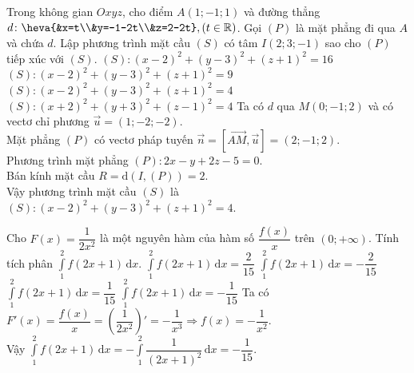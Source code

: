 \begin{ex}%
Trong không gian $Oxyz$, cho điểm $A(1;-1;1)$ và đường thẳng $d \colon \heva{&x=t\\&y=-1-2t\\&z=2-2t}, (t\in \mathbb{R})$. Gọi
$(P)$ là mặt phẳng đi qua $A$ và chứa $d$. Lập phương trình mặt cầu $(S)$ có tâm $I(2; 3;-1)$ sao cho $(P)$ tiếp xúc với $(S)$.
\choice
{$(S)\colon(x-2)^2+(y-3)^2+(z+1)^2=16$}
{$(S)\colon(x-2)^2+(y-3)^2+(z+1)^2=9$}
{\True $(S)\colon(x-2)^2+(y-3)^2+(z+1)^2=4$}
{$(S)\colon(x+2)^2+(y+3)^2+(z-1)^2=4$}
\loigiai
{Ta có 
$d$ qua $M(0;- 1; 2)$ và có vectơ chỉ phương $\overrightarrow{u}=(1; - 2; - 2)$.\\
Mặt phẳng $(P)$ có vectơ pháp tuyến $\overrightarrow{n}=[\overrightarrow{AM},\overrightarrow{u}]=(2;- 1; 2)$.\\
Phương trình mặt phẳng $(P)\colon 2 x - y +2 z -5 = 0$.\\
Bán kính mặt cầu $R= \mathrm{d}(I,(P)) =2$.\\
Vậy phương trình mặt cầu $(S)$ là $(S)\colon(x-2)^2+(y-3)^2+(z+1)^2=4$.
}
\end{ex}

\begin{ex}%
Cho $F(x)=\dfrac{1}{2x^2}$ là một nguyên hàm của hàm số $\dfrac{f(x)}{x}$ trên $(0;+\infty)$. Tính tích phân $\displaystyle\int\limits_1^2f(2x+1)\mathrm{\,d}x.$
\choice
{$\displaystyle\int\limits_1^2f(2x+1)\mathrm{\,d}x=\dfrac{2}{15}$}
{$\displaystyle\int\limits_1^2f(2x+1)\mathrm{\,d}x=-\dfrac{2}{15}$}
{$\displaystyle\int\limits_1^2f(2x+1)\mathrm{\,d}x=\dfrac{1}{15}$}
{\True $\displaystyle\int\limits_1^2f(2x+1)\mathrm{\,d}x=-\dfrac{1}{15}$}
\loigiai
{Ta có $F'(x)=\dfrac{f(x)}{x}=\left(\dfrac{1}{2x^2}\right)'=-\dfrac{1}{x^3}\Rightarrow f(x)=-\dfrac{1}{x^2}$.\\
Vậy $\displaystyle\int\limits_1^2f(2x+1)\mathrm{\,d}x=-\displaystyle\int\limits_1^2\dfrac{1}{(2x+1)^2}\mathrm{\,d}x=-\dfrac{1}{15}.$
}
\end{ex}

